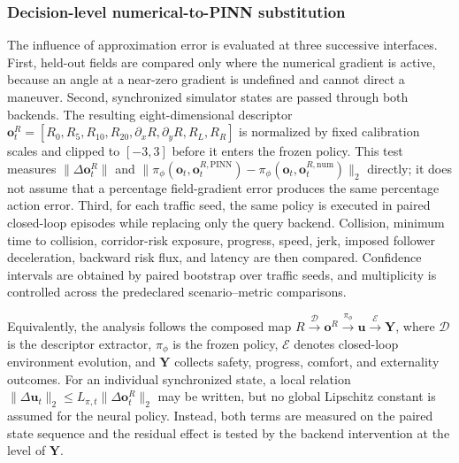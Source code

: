 \subsubsection{Decision-level numerical-to-PINN substitution}
The influence of approximation error is evaluated at three successive
interfaces. First, held-out fields are compared only where the numerical
gradient is active, because an angle at a near-zero gradient is undefined and
cannot direct a maneuver. Second, synchronized simulator states are passed
through both backends. The resulting eight-dimensional descriptor
$\mathbf{o}^{R}_{t}=[R_{0},R_{5},R_{10},R_{20},\partial_xR,
\partial_yR,R_{L},R_{R}]$ is normalized by fixed calibration scales and clipped
to $[-3,3]$ before it enters the frozen policy. This test measures
$\|\Delta\mathbf{o}^{R}_{t}\|$ and
$\|\pi_{\phi}(\mathbf{o}_{t},\mathbf{o}^{R,\mathrm{PINN}}_{t})-
\pi_{\phi}(\mathbf{o}_{t},\mathbf{o}^{R,\mathrm{num}}_{t})\|_{2}$ directly;
it does not assume that a percentage field-gradient error produces the same
percentage action error. Third, for each traffic seed, the same policy is
executed in paired closed-loop episodes while replacing only the query
backend. Collision, minimum time to collision, corridor-risk exposure,
progress, speed, jerk, imposed follower deceleration, backward risk flux, and
latency are then compared. Confidence intervals are obtained by paired
bootstrap over traffic seeds, and multiplicity is controlled across the
predeclared scenario--metric comparisons.

Equivalently, the analysis follows the composed map
$R\xrightarrow{\mathcal D}\mathbf{o}^{R}
\xrightarrow{\pi_{\phi}}\mathbf{u}\xrightarrow{\mathcal E}\mathbf{Y}$,
where $\mathcal D$ is the descriptor extractor, $\pi_{\phi}$ is the frozen
policy, $\mathcal E$ denotes closed-loop environment evolution, and
$\mathbf{Y}$ collects safety, progress, comfort, and externality outcomes.
For an individual synchronized state, a local relation
$\|\Delta\mathbf{u}_{t}\|_{2}\leq
L_{\pi,t}\|\Delta\mathbf{o}^{R}_{t}\|_{2}$ may be written, but no global
Lipschitz constant is assumed for the neural policy. Instead, both terms are
measured on the paired state sequence and the residual effect is tested by the
backend intervention at the level of $\mathbf{Y}$.

